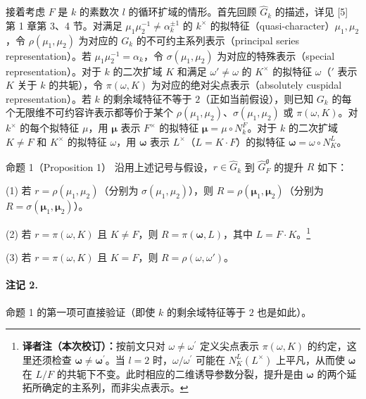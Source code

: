 接着考虑 $F$ 是 $k$ 的素数次 $l$ 的循环扩域的情形。首先回顾 $\widehat G_k$ 的描述，详见 [5] 第 1 章第 3、4 节。对满足 $\mu_1\mu_2^{-1}\ne\alpha_k^{\pm1}$ 的 $k^\times$ 的拟特征（quasi-character）$\mu_1,\mu_2$，令 $\rho(\mu_1,\mu_2)$ 为对应的 $G_k$ 的不可约主系列表示（principal series representation）。若 $\mu_1\mu_2^{-1}=\alpha_k$，令 $\sigma(\mu_1,\mu_2)$ 为对应的特殊表示（special representation）。对于 $k$ 的二次扩域 $K$ 和满足 $\omega'\ne\omega$ 的 $K^\times$ 的拟特征 $\omega$（$'$ 表示 $K$ 关于 $k$ 的共轭），令 $\pi(\omega,K)$ 为对应的绝对尖点表示（absolutely cuspidal representation）。若 $k$ 的剩余域特征不等于 $2$（正如当前假设），则已知 $G_k$ 的每个无限维不可约容许表示都等价于某个 $\rho(\mu_1,\mu_2)$、$\sigma(\mu_1,\mu_2)$ 或 $\pi(\omega,K)$。对 $k^\times$ 的每个拟特征 $\mu$，用 $\boldsymbol\mu$ 表示 $F^\times$ 的拟特征 $\boldsymbol\mu=\mu\circ N_k^F$。对于 $k$ 的二次扩域 $K\ne F$ 和 $K^\times$ 的拟特征 $\omega$，用 $\boldsymbol\omega$ 表示 $L^\times$（$L=K\cdot F$）的拟特征 $\boldsymbol\omega=\omega\circ N_K^L$。

\begin{originaltheorem}{命题 1（Proposition 1）}
沿用上述记号与假设，$r\in\widehat G_k$ 到 $\widehat G_F^{\mathfrak g}$ 的提升 $R$ 如下：

(1) 若 $r=\rho(\mu_1,\mu_2)$（分别为 $\sigma(\mu_1,\mu_2)$），则 $R=\rho(\boldsymbol\mu_1,\boldsymbol\mu_2)$（分别为 $R=\sigma(\boldsymbol\mu_1,\boldsymbol\mu_2)$）。

(2) 若 $r=\pi(\omega,K)$ 且 $K\ne F$，则 $R=\pi(\boldsymbol\omega,L)$，其中 $L=F\cdot K$。\footnote{\textbf{译者注（本次校订）：}按前文只对 $\omega\ne\omega^{\prime}$ 定义尖点表示 $\pi(\omega,K)$ 的约定，这里还须检查 $\boldsymbol\omega\ne\boldsymbol\omega^{\prime}$。当 $l=2$ 时，$\omega/\omega^{\prime}$ 可能在 $N_K^L(L^\times)$ 上平凡，从而使 $\boldsymbol\omega$ 在 $L/F$ 的共轭下不变。此时相应的二维诱导参数分裂，提升是由 $\boldsymbol\omega$ 的两个延拓所确定的主系列，而非尖点表示。}

(3) 若 $r=\pi(\omega,K)$ 且 $K=F$，则 $R=\rho(\omega,\omega')$。
\end{originaltheorem}

\paragraph*{注记 2.}
命题 1 的第一项可直接验证（即使 $k$ 的剩余域特征等于 $2$ 也是如此）。

